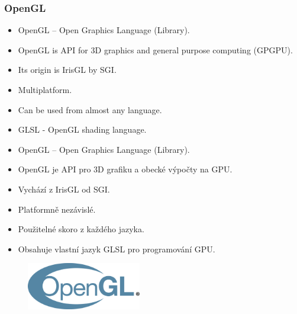 
\begin{frame}\frametitle{OpenGL}\scriptsize
\begin{itemize}
\item OpenGL -- Open Graphics Language (Library). 
\item OpenGL is API for 3D graphics and general purpose computing (GPGPU).
\item Its origin is IrisGL by SGI.
\item Multiplatform.
\item Can be used from almost any language.
\item GLSL - OpenGL shading language.
\end{itemize}

\begin{itemize}
\item OpenGL -- Open Graphics Language (Library).
\item OpenGL je API pro 3D grafiku a obecké výpočty na GPU.
\item Vychází z IrisGL od SGI.
\item Platformně nezávislé.
\item Použitelné skoro z každého jazyka.
\item Obsahuje vlastní jazyk GLSL pro programování GPU.
\end{itemize}
  \begin{figure}[h]
  \includegraphics[width=5cm,keepaspectratio]{pics/opengl/logo}
  \end{figure}
\end{frame}


